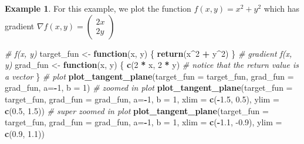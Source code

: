 \documentclass[
]{book}
\newenvironment{Shaded}{\begin{snugshade}}{\end{snugshade}}
\newcommand{\CommentTok}[1]{\textcolor[rgb]{0.56,0.35,0.01}{\textit{#1}}}
\newcommand{\ControlFlowTok}[1]{\textcolor[rgb]{0.13,0.29,0.53}{\textbf{#1}}}
\newcommand{\DataTypeTok}[1]{\textcolor[rgb]{0.13,0.29,0.53}{#1}}
\newcommand{\DecValTok}[1]{\textcolor[rgb]{0.00,0.00,0.81}{#1}}
\newcommand{\FloatTok}[1]{\textcolor[rgb]{0.00,0.00,0.81}{#1}}
\newcommand{\KeywordTok}[1]{\textcolor[rgb]{0.13,0.29,0.53}{\textbf{#1}}}
\newcommand{\NormalTok}[1]{#1}
\newcommand{\OperatorTok}[1]{\textcolor[rgb]{0.81,0.36,0.00}{\textbf{#1}}}
\newcommand{\StringTok}[1]{\textcolor[rgb]{0.31,0.60,0.02}{#1}}
\theoremstyle{definition}
\theoremstyle{definition}
\newtheorem{example}{Example}[chapter]
\theoremstyle{definition}
\theoremstyle{definition}
\theoremstyle{remark}
\begin{document}
\begin{example}
For this example, we plot the function \(f(x, y) = x^2 + y^2\) which has gradient \(\nabla f(x, y) = \begin{pmatrix} 2x \\ 2y\end{pmatrix}\)

\begin{Shaded}
\begin{Highlighting}[]
\CommentTok{# f(x, y)}
\NormalTok{target_fun <-}\StringTok{ }\ControlFlowTok{function}\NormalTok{(x, y) \{}
    \KeywordTok{return}\NormalTok{(x}\OperatorTok{^}\DecValTok{2} \OperatorTok{+}\StringTok{ }\NormalTok{y}\OperatorTok{^}\DecValTok{2}\NormalTok{)}
\NormalTok{\}}
\CommentTok{# gradient f(x, y)}
\NormalTok{grad_fun <-}\StringTok{ }\ControlFlowTok{function}\NormalTok{(x, y) \{}
    \KeywordTok{c}\NormalTok{(}\DecValTok{2} \OperatorTok{*}\StringTok{ }\NormalTok{x, }\DecValTok{2} \OperatorTok{*}\StringTok{ }\NormalTok{y) }\CommentTok{# notice that the return value is a vector}
\NormalTok{\}}
\CommentTok{# plot }
\KeywordTok{plot_tangent_plane}\NormalTok{(}\DataTypeTok{target_fun =}\NormalTok{ target_fun, }\DataTypeTok{grad_fun =}\NormalTok{ grad_fun, }\DataTypeTok{a=}\OperatorTok{-}\DecValTok{1}\NormalTok{, }\DataTypeTok{b =} \DecValTok{1}\NormalTok{)}
\CommentTok{# zoomed in plot}
\KeywordTok{plot_tangent_plane}\NormalTok{(}\DataTypeTok{target_fun =}\NormalTok{ target_fun, }\DataTypeTok{grad_fun =}\NormalTok{ grad_fun, }\DataTypeTok{a=}\OperatorTok{-}\DecValTok{1}\NormalTok{, }\DataTypeTok{b =} \DecValTok{1}\NormalTok{, }\DataTypeTok{xlim =} \KeywordTok{c}\NormalTok{(}\OperatorTok{-}\FloatTok{1.5}\NormalTok{, }\FloatTok{0.5}\NormalTok{), }\DataTypeTok{ylim =} \KeywordTok{c}\NormalTok{(}\FloatTok{0.5}\NormalTok{, }\FloatTok{1.5}\NormalTok{))}
\CommentTok{# super zoomed in plot}
\KeywordTok{plot_tangent_plane}\NormalTok{(}\DataTypeTok{target_fun =}\NormalTok{ target_fun, }\DataTypeTok{grad_fun =}\NormalTok{ grad_fun, }\DataTypeTok{a=}\OperatorTok{-}\DecValTok{1}\NormalTok{, }\DataTypeTok{b =} \DecValTok{1}\NormalTok{, }\DataTypeTok{xlim =} \KeywordTok{c}\NormalTok{(}\OperatorTok{-}\FloatTok{1.1}\NormalTok{, }\FloatTok{-0.9}\NormalTok{), }\DataTypeTok{ylim =} \KeywordTok{c}\NormalTok{(}\FloatTok{0.9}\NormalTok{, }\FloatTok{1.1}\NormalTok{))}
\end{Highlighting}
\end{Shaded}


\end{example}
\end{document}
